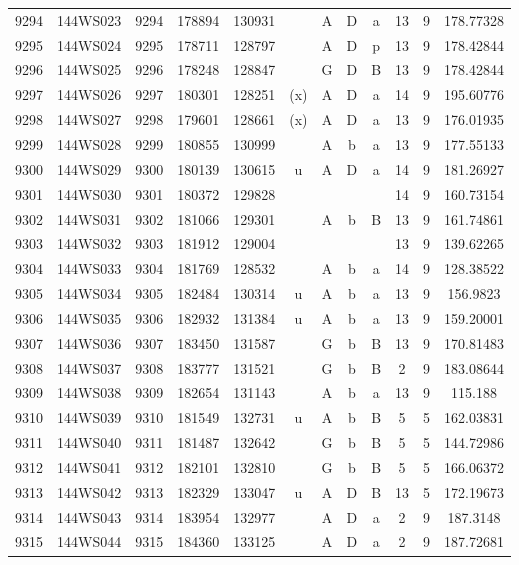 \begin{tabular}{|*{12}{c|}}
9294 & 144WS023 & 9294 & 178894 & 130931 &  & A & D & a & 13 & 9 & 178.77328 \\ 
9295 & 144WS024 & 9295 & 178711 & 128797 &  & A & D & p & 13 & 9 & 178.42844 \\ 
9296 & 144WS025 & 9296 & 178248 & 128847 &  & G & D & B & 13 & 9 & 178.42844 \\ 
9297 & 144WS026 & 9297 & 180301 & 128251 & (x) & A & D & a & 14 & 9 & 195.60776 \\ 
9298 & 144WS027 & 9298 & 179601 & 128661 & (x) & A & D & a & 13 & 9 & 176.01935 \\ 
9299 & 144WS028 & 9299 & 180855 & 130999 &  & A & b & a & 13 & 9 & 177.55133 \\ 
9300 & 144WS029 & 9300 & 180139 & 130615 & u & A & D & a & 14 & 9 & 181.26927 \\ 
9301 & 144WS030 & 9301 & 180372 & 129828 &  &  &  &  & 14 & 9 & 160.73154 \\ 
9302 & 144WS031 & 9302 & 181066 & 129301 &  & A & b & B & 13 & 9 & 161.74861 \\ 
9303 & 144WS032 & 9303 & 181912 & 129004 &  &  &  &  & 13 & 9 & 139.62265 \\ 
9304 & 144WS033 & 9304 & 181769 & 128532 &  & A & b & a & 14 & 9 & 128.38522 \\ 
9305 & 144WS034 & 9305 & 182484 & 130314 & u & A & b & a & 13 & 9 & 156.9823 \\ 
9306 & 144WS035 & 9306 & 182932 & 131384 & u & A & b & a & 13 & 9 & 159.20001 \\ 
9307 & 144WS036 & 9307 & 183450 & 131587 &  & G & b & B & 13 & 9 & 170.81483 \\ 
9308 & 144WS037 & 9308 & 183777 & 131521 &  & G & b & B & 2 & 9 & 183.08644 \\ 
9309 & 144WS038 & 9309 & 182654 & 131143 &  & A & b & a & 13 & 9 & 115.188 \\ 
9310 & 144WS039 & 9310 & 181549 & 132731 & u & A & b & B & 5 & 5 & 162.03831 \\ 
9311 & 144WS040 & 9311 & 181487 & 132642 &  & G & b & B & 5 & 5 & 144.72986 \\ 
9312 & 144WS041 & 9312 & 182101 & 132810 &  & G & b & B & 5 & 5 & 166.06372 \\ 
9313 & 144WS042 & 9313 & 182329 & 133047 & u & A & D & B & 13 & 5 & 172.19673 \\ 
9314 & 144WS043 & 9314 & 183954 & 132977 &  & A & D & a & 2 & 9 & 187.3148 \\ 
9315 & 144WS044 & 9315 & 184360 & 133125 &  & A & D & a & 2 & 9 & 187.72681 \\ 

\end{tabular}
